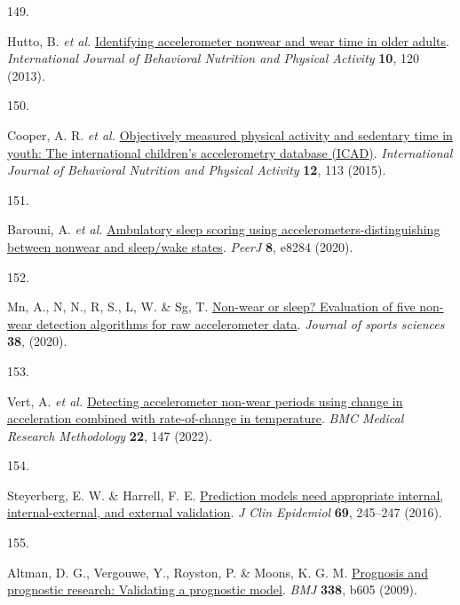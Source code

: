 \documentclass[
  10pt,
]{scrbook}
\newlength{\cslhangindent}
\newlength{\csllabelwidth}
\newlength{\cslentryspacingunit} %
\newenvironment{CSLReferences}[2] %
 {%
  \setlength{\parindent}{0pt}
  \ifodd #1
  \let\oldpar\par
  \def\par{\hangindent=\cslhangindent\oldpar}
  \fi
  \setlength{\parskip}{#2\cslentryspacingunit}
 }%
 {}
\newcommand{\CSLLeftMargin}[1]{\parbox[t]{\csllabelwidth}{#1}}
\newcommand{\CSLRightInline}[1]{\parbox[t]{\linewidth - \csllabelwidth}{#1}\break}
\let\originaltextbf\textbf
\renewcommand{\textbf}[1]{\textcolor{color1}{\textsf{\originaltextbf{#1}}}}
\begin{document}
\begin{CSLReferences}{0}{0}
\leavevmode{}%
\CSLLeftMargin{149. }%
\CSLRightInline{Hutto, B. \emph{et al.}
\href{https://doi.org/10.1186/1479-5868-10-120}{Identifying
accelerometer nonwear and wear time in older adults}.
\emph{International Journal of Behavioral Nutrition and Physical
Activity} \textbf{10}, 120 (2013).}

\leavevmode{}%
\CSLLeftMargin{150. }%
\CSLRightInline{Cooper, A. R. \emph{et al.}
\href{https://doi.org/10.1186/s12966-015-0274-5}{Objectively measured
physical activity and sedentary time in youth: The international
children's accelerometry database ({ICAD})}. \emph{International Journal
of Behavioral Nutrition and Physical Activity} \textbf{12}, 113 (2015).}

\leavevmode{}%
\CSLLeftMargin{151. }%
\CSLRightInline{Barouni, A. \emph{et al.}
\href{https://doi.org/10.7717/peerj.8284}{Ambulatory sleep scoring using
accelerometers-distinguishing between nonwear and sleep/wake states}.
\emph{{PeerJ}} \textbf{8}, e8284 (2020).}

\leavevmode{}%
\CSLLeftMargin{152. }%
\CSLRightInline{Mn, A., N, N., R, S., L, W. \& Sg, T.
\href{https://doi.org/10.1080/02640414.2019.1703301}{Non-wear or sleep?
Evaluation of five non-wear detection algorithms for raw accelerometer
data}. \emph{Journal of sports sciences} \textbf{38}, (2020).}

\leavevmode{}%
\CSLLeftMargin{153. }%
\CSLRightInline{Vert, A. \emph{et al.}
\href{https://doi.org/10.1186/s12874-022-01633-6}{Detecting
accelerometer non-wear periods using change in acceleration combined
with rate-of-change in temperature}. \emph{{BMC} Medical Research
Methodology} \textbf{22}, 147 (2022).}

\leavevmode{}%
\CSLLeftMargin{154. }%
\CSLRightInline{Steyerberg, E. W. \& Harrell, F. E.
\href{https://doi.org/10.1016/j.jclinepi.2015.04.005}{Prediction models
need appropriate internal, internal-external, and external validation}.
\emph{J Clin Epidemiol} \textbf{69}, 245--247 (2016).}

\leavevmode{}%
\CSLLeftMargin{155. }%
\CSLRightInline{Altman, D. G., Vergouwe, Y., Royston, P. \& Moons, K. G.
M. \href{https://doi.org/10.1136/bmj.b605}{Prognosis and prognostic
research: Validating a prognostic model}. \emph{{BMJ}} \textbf{338},
b605 (2009).}


\end{CSLReferences}
\end{document}
